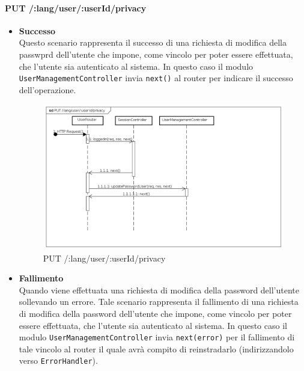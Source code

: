 \paragraph{PUT /:lang/user/:userId/privacy}
\begin{itemize}
\item \textbf{Successo}
\\
Questo scenario rappresenta il successo di una richiesta di modifica della passwprd dell'utente che impone, come vincolo per poter essere effettuata, che l'utente sia autenticato al sistema.  
In questo caso il modulo \texttt{UserManagementController} invia \texttt{next()} al router per indicare il successo dell'operazione.

\label{Procedura di modifica password}
\begin{figure}[ht]
	\centering
	\includegraphics[scale=0.40]{UML/DiagrammiDiSequenza/Back-end/PUT_LangUserUserIdPrivacySuccess.png}
	\caption{PUT /:lang/user/:userId/privacy}
\end{figure}
\FloatBarrier
\item \textbf{Fallimento}
\\
Quando viene effettuata una richiesta di modifica della password dell'utente sollevando un errore. Tale scenario rappresenta il fallimento di una richiesta di modifica della password dell'utente che impone, come vincolo per poter essere effettuata, che l'utente sia autenticato al sistema. In questo caso il modulo \texttt{UserManagementController} invia \texttt{next(error)} per il fallimento di tale vincolo al router il quale avrà compito di reinstradarlo (indirizzandolo verso \texttt{ErrorHandler}).




\end{itemize}
